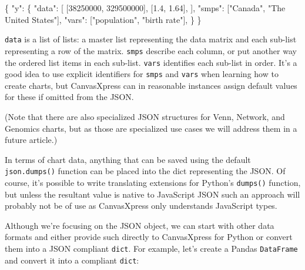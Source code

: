 \documentclass[
  letterpaper,
  DIV=11,
  numbers=noendperiod]{scrartcl}
\newenvironment{Shaded}{\begin{snugshade}}{\end{snugshade}}
\newcommand{\DecValTok}[1]{\textcolor[rgb]{0.68,0.00,0.00}{#1}}
\newcommand{\FloatTok}[1]{\textcolor[rgb]{0.68,0.00,0.00}{#1}}
\newcommand{\NormalTok}[1]{\textcolor[rgb]{0.00,0.23,0.31}{#1}}
\newcommand{\StringTok}[1]{\textcolor[rgb]{0.13,0.47,0.30}{#1}}
\begin{document}
\begin{Shaded}
\begin{Highlighting}[]
\NormalTok{\{}
    \StringTok{"y"}\NormalTok{: \{}
        \StringTok{"data"}\NormalTok{: [}
\NormalTok{            [}\DecValTok{38250000}\NormalTok{, }\DecValTok{329500000}\NormalTok{],}
\NormalTok{            [}\FloatTok{1.4}\NormalTok{, }\FloatTok{1.64}\NormalTok{],}
\NormalTok{        ],}
        \StringTok{"smps"}\NormalTok{: [}\StringTok{"Canada"}\NormalTok{, }\StringTok{"The United States"}\NormalTok{],}
        \StringTok{"vars"}\NormalTok{: [}\StringTok{"population"}\NormalTok{, }\StringTok{"birth rate"}\NormalTok{],}
\NormalTok{    \}}
\NormalTok{\}}
\end{Highlighting}
\end{Shaded}

\texttt{data} is a list of lists: a master list representing the data
matrix and each sub-list representing a row of the matrix. \texttt{smps}
describe each column, or put another way the ordered list items in each
sub-list. \texttt{vars} identifies each sub-list in order. It's a good
idea to use explicit identifiers for \texttt{smps} and \texttt{vars}
when learning how to create charts, but CanvasXpress can in reasonable
instances assign default values for these if omitted from the JSON.

(Note that there are also specialized JSON structures for Venn, Network,
and Genomics charts, but as those are specialized use cases we will
address them in a future article.)

In terms of chart data, anything that can be saved using the default
\texttt{json.dumps()} function can be placed into the dict representing
the JSON. Of course, it's possible to write translating extensions for
Python's \texttt{dumps()} function, but unless the resultant value is
native to JavaScript JSON such an approach will probably not be of use
as CanvasXpress only understands JavaScript types.

Although we're focusing on the JSON object, we can start with other data
formats and either provide such directly to CanvasXpress for Python or
convert them into a JSON compliant \texttt{dict}. For example, let's
create a Pandas \texttt{DataFrame} and convert it into a compliant
\texttt{dict}:
\end{document}
